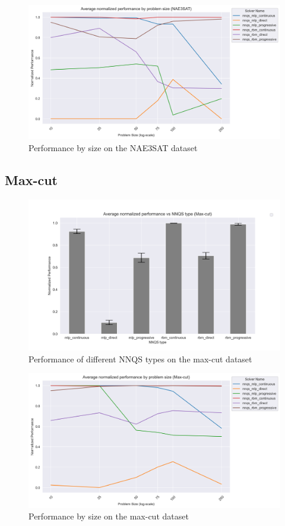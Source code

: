 \begin{figure}[!h]
    \centering
    \includegraphics[width=1\linewidth]{images/nae3sat_nnqs_size.png}
    \caption{Performance by size on the NAE3SAT dataset}
    \label{nnqs-nae3sat-size}
\end{figure}

\subsection{Max-cut}
\begin{figure}[!h]
    \centering
    \includegraphics[width=1\linewidth]{images/maxcut_nnqs_avg.png}
    \caption{Performance of different NNQS types on the max-cut dataset}
    \label{nnqs-maxcut-average}
\end{figure}

\begin{figure}[!h]
    \centering
    \includegraphics[width=1\linewidth]{images/maxcut_nnqs_size.png}
    \caption{Performance by size on the max-cut dataset}
    \label{nnqs-maxcut-size}
\end{figure}

